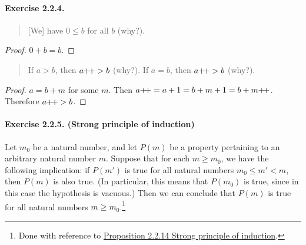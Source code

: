 \paragraph{Exercise 2.2.4.}
\begin{quote}
    [We] have $0\leq b$ for all $b$ (why?).
\end{quote}
\begin{proof}
    $0+b=b$.
\end{proof}
\begin{quote}
    If $a>b$, then $a{+}{\mkern-3mu}{+} >b$ (why?). If $a=b$, then $a{+}{\mkern-3mu}{+} >b$ (why?).
\end{quote}
\begin{proof}
    $a=b+m$ for some $m$. Then $a{+}{\mkern-3mu}{+}=a+1=b+m+1=b+m{+}{\mkern-3mu}{+}$. Therefore $a{+}{\mkern-3mu}{+} >b$.
\end{proof}

\paragraph{Exercise 2.2.5. (Strong principle of induction)} Let $m_0$ be a natural number, and let $P(m)$ be a property pertaining to an arbitrary natural number $m$. Suppose that for each $m \geq m_0$, we have the following implication: if $P(m')$ is true for all natural numbers $m_0 \leq m' < m$, then $P(m)$ is also true. (In particular, this means that $P(m_0)$ is true, since in this case the hypothesis is vacuous.) Then we can conclude that $P(m)$ is true for all natural numbers $m \geq m_0$.\footnote{Done with reference to \href{https://zhuanlan.zhihu.com/p/70295136}{Proposition 2.2.14 Strong principle of induction}.}
